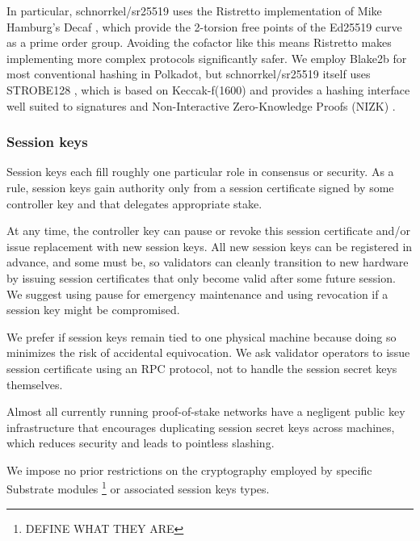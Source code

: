 In particular, schnorrkel/sr25519 uses the Ristretto implementation \cite{Ristretto} of Mike Hamburg's Decaf , which provide the 2-torsion free points of the Ed25519 curve as a prime order group.  Avoiding the cofactor like this means Ristretto makes implementing more complex protocols significantly safer.  We employ Blake2b for most conventional hashing in Polkadot, but schnorrkel/sr25519 itself uses STROBE128 \cite{STROBE}, which is based on Keccak-f(1600) and provides a hashing interface well suited to signatures and Non-Interactive Zero-Knowledge Proofs (NIZK) \cite{} \cite{}.

\subsubsection{Session keys}\label{sec:session_keys}

Session keys each fill roughly one particular role in consensus or security.  As a rule, session keys gain authority only from a session certificate signed by some controller key and that delegates appropriate stake.  

At any time, the controller key can pause or revoke this session certificate and/or issue replacement with new session keys.  All new session keys can be registered in advance, and some must be, so validators can cleanly transition to new hardware by issuing session certificates that only become valid after some future session.  We suggest using pause for emergency maintenance and using revocation if a session key might be compromised.  

We prefer if session keys remain tied to one physical machine because doing so minimizes the risk of accidental equivocation.  We ask validator operators to issue session certificate using an RPC protocol, not to handle the session secret keys themselves.  

Almost all currently running proof-of-stake networks \cite{} have a negligent public key infrastructure that encourages duplicating session secret keys across machines, which reduces security and leads to pointless slashing.

\smallskip

We impose no prior restrictions on the cryptography employed by specific Substrate modules \footnote{DEFINE WHAT THEY ARE} or associated session keys types.  

